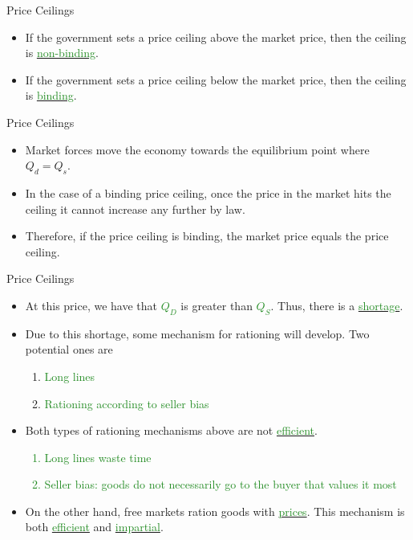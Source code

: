 \documentclass[xcolor={dvipsnames},pdf, hyperref={colorlinks=true, citecolor=ForestGreen, linkcolor=BlueViolet, urlcolor=Magenta}]{beamer}
\newcommand{\ddp}[1]{{\textcolor{ForestGreen}{#1}}}
\newcommand{\dd}[1]{{\underline{\textcolor{ForestGreen}{#1}}}}
\begin{document}
\begin{frame}{Price  Ceilings}
	\begin{itemize}
		\item If the government sets a price ceiling above the market price, then the ceiling is \dd{non-binding}.
		\item If the government sets a price ceiling below the market price, then the ceiling is \dd{binding}.
	\end{itemize}
\end{frame}

\begin{frame}{Price  Ceilings}
	\begin{itemize}
		\item Market forces move the economy towards the equilibrium point where $Q_d = Q_s$.
		\item In the case of a binding price ceiling, once the price in the market hits the ceiling it cannot increase any further by law.
		\item Therefore, if the price ceiling is binding, the market price equals the price ceiling.
	\end{itemize}
\end{frame}

\begin{frame}{Price  Ceilings}
	\begin{itemize}
		\item At this price, we have that \dd{$Q_D$} is greater than \dd{$Q_S$}. Thus, there is a \dd{shortage}.
		\item Due to this shortage, some mechanism for rationing will develop. Two potential ones are
		\begin{enumerate}
			\item \ddp{Long lines}
			\item \ddp{Rationing according to seller bias}
		\end{enumerate}
	\item Both types of rationing mechanisms above are not \dd{efficient}. 
	\ddp{
			\begin{enumerate}
				\item Long lines waste time
				\item Seller bias: goods do not necessarily go to the buyer that values it most
			\end{enumerate}}
	\item On the other hand, free markets ration goods with \dd{prices}. This mechanism is both \dd{efficient} and \dd{impartial}.
	\end{itemize}
\end{frame}
\end{document}
